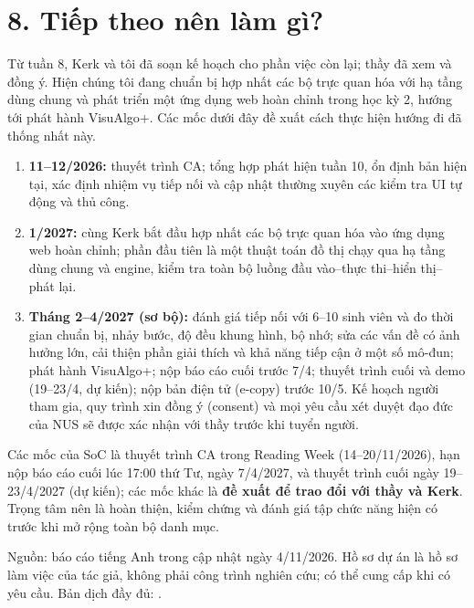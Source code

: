 \documentclass[11pt,a4paper]{article}
\begin{document}
\section*{8. Tiếp theo nên làm gì?}
Từ tuần 8, Kerk và tôi đã soạn kế hoạch cho phần việc còn lại; thầy đã xem và đồng ý. Hiện chúng tôi đang chuẩn bị hợp nhất các bộ trực quan hóa với hạ tầng dùng chung và phát triển một ứng dụng web hoàn chỉnh trong học kỳ 2, hướng tới phát hành VisuAlgo+. Các mốc dưới đây đề xuất cách thực hiện hướng đi đã thống nhất này.
\begin{enumerate}
\item \textbf{11--12/2026:} thuyết trình CA; tổng hợp phát hiện tuần 10, ổn định bản hiện tại, xác định nhiệm vụ tiếp nối và cập nhật thường xuyên các kiểm tra UI tự động và thủ công.
\item \textbf{1/2027:} cùng Kerk bắt đầu hợp nhất các bộ trực quan hóa vào ứng dụng web hoàn chỉnh; phần đầu tiên là một thuật toán đồ thị chạy qua hạ tầng dùng chung và engine, kiểm tra toàn bộ luồng đầu vào--thực thi--hiển thị--phát lại.
\item \textbf{Tháng 2--4/2027 (sơ bộ):} đánh giá tiếp nối với 6--10 sinh viên và đo thời gian chuẩn bị, nhảy bước, độ đều khung hình, bộ nhớ; sửa các vấn đề có ảnh hưởng lớn, cải thiện phần giải thích và khả năng tiếp cận ở một số mô-đun; phát hành VisuAlgo+; nộp báo cáo cuối trước 7/4; thuyết trình cuối và demo (19--23/4, dự kiến); nộp bản điện tử (e-copy) trước 10/5. Kế hoạch người tham gia, quy trình xin đồng ý (consent) và mọi yêu cầu xét duyệt đạo đức của NUS sẽ được xác nhận với thầy trước khi tuyển người.
\end{enumerate}
Các mốc của SoC là thuyết trình CA trong Reading Week (14--20/11/2026), hạn nộp báo cáo cuối lúc 17:00 thứ Tư, ngày 7/4/2027, và thuyết trình cuối ngày 19--23/4/2027 (dự kiến); các mốc khác là \textbf{đề xuất để trao đổi với thầy và Kerk}. Trọng tâm nên là hoàn thiện, kiểm chứng và đánh giá tập chức năng hiện có trước khi mở rộng toàn bộ danh mục.

\vfill
{\small\color{muted}Nguồn: báo cáo tiếng Anh trong  cập nhật ngày 4/11/2026. Hồ sơ dự án là hồ sơ làm việc của tác giả, không phải công trình nghiên cứu; có thể cung cấp khi có yêu cầu. Bản dịch đầy đủ: .}
\end{document}
